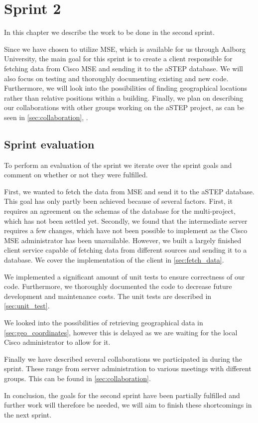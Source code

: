 \chapter{Sprint 2} \label{cha:sprint2}
In this chapter we describe the work to be done in the second sprint. 

Since we have chosen to utilize MSE, which is available for us through Aalborg University, the main goal for this sprint is to create a client responsible for fetching data from Cisco MSE and sending it to the aSTEP database. We will also focus on testing and thoroughly documenting existing and new code. Furthermore, we will look into the possibilities of finding geographical locations rather than relative positions within a building. Finally, we plan on describing our collaborations with other groups working on the aSTEP project, as can be seen in \cref{sec:collaboration}, .





\section{Sprint evaluation}\label{sec:s2_eval}
To perform an evaluation of the sprint we iterate over the sprint goals and comment on whether or not they were fulfilled.

First, we wanted to fetch the data from MSE and send it to the aSTEP database. This goal has only partly been achieved because of several factors. First, it requires an agreement on the schemas of the database for the multi-project, which has not been settled yet. Secondly, we found that the intermediate server requires a few changes, which have not been possible to implement as the Cisco MSE administrator has been unavailable. However, we built a largely finished client service capable of fetching data from different sources and sending it to a database. We cover the implementation of the client in \cref{sec:fetch_data}.

We implemented a significant amount of unit tests to ensure correctness of our code. Furthermore, we thoroughly documented the code to decrease future development and maintenance costs. The unit tests are described in \cref{sec:unit_test}.

We looked into the possibilities of retrieving geographical data in \cref{sec:geo_coordinates}, however this is delayed as we are waiting for the local Cisco administrator to allow for it.

Finally we have described several collaborations we participated in during the sprint. These range from server administration to various meetings with different groups. This can be found in \cref{sec:collaboration}. 

In conclusion, the goals for the second sprint have been partially fulfilled and further work will therefore be needed, we will aim to finish these shortcomings in the next sprint.